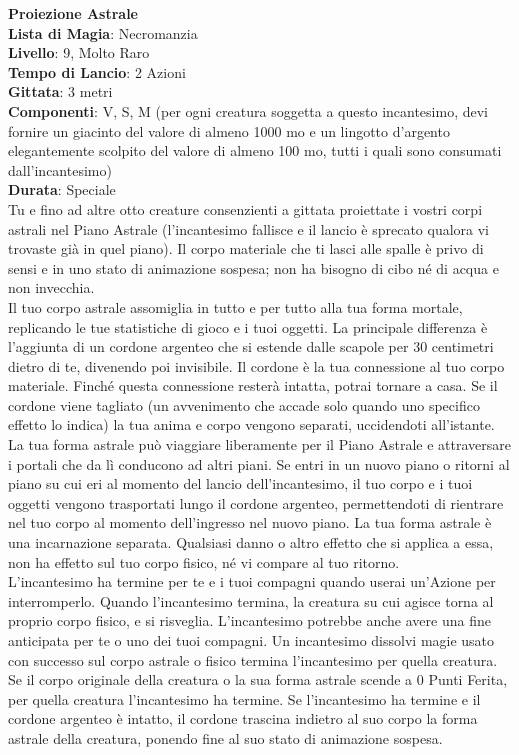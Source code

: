 \documentclass[a4paper,twoside,openany]{book}
\begin{document}
\begin{multicols}{2}
\medskip\textbf{Proiezione Astrale}\\
\textbf{Lista di Magia}: Necromanzia\\
\textbf{Livello}: 9, Molto Raro\\
\textbf{Tempo di Lancio}: 2 Azioni\\
\textbf{Gittata}: 3 metri\\
\textbf{Componenti}: V, S, M (per ogni creatura soggetta a questo incantesimo, devi fornire un giacinto del valore di almeno 1000 mo e un lingotto d'argento elegantemente scolpito del valore di almeno 100 mo, tutti i quali sono consumati dall'incantesimo)\\
\textbf{Durata}: Speciale\\
Tu e fino ad altre otto creature consenzienti a gittata proiettate i vostri corpi astrali nel Piano Astrale (l'incantesimo fallisce e il lancio è sprecato qualora vi trovaste già in quel piano). Il corpo materiale che ti lasci alle spalle è privo di sensi e in uno stato di animazione sospesa; non ha bisogno di cibo né di acqua e non invecchia.\\
Il tuo corpo astrale assomiglia in tutto e per tutto alla tua forma mortale, replicando le tue statistiche di gioco e i tuoi oggetti. La principale differenza è l'aggiunta di un cordone argenteo che si estende dalle scapole per 30 centimetri dietro di te, divenendo poi invisibile. Il cordone è la tua connessione al tuo corpo materiale. Finché questa connessione resterà intatta, potrai tornare a casa. Se il cordone viene tagliato (un avvenimento che accade solo quando uno specifico effetto lo indica) la tua anima e corpo vengono separati, uccidendoti all'istante.\\
La tua forma astrale può viaggiare liberamente per il Piano Astrale e attraversare i portali che da lì conducono ad altri piani. Se entri in un nuovo piano o ritorni al piano su cui eri al momento del lancio dell'incantesimo, il tuo corpo e i tuoi oggetti vengono trasportati lungo il cordone argenteo, permettendoti di rientrare nel tuo corpo al momento dell'ingresso nel nuovo piano. La tua forma astrale è una incarnazione separata. Qualsiasi danno o altro effetto che si applica a essa, non ha effetto sul tuo corpo fisico, né vi compare al tuo ritorno.\\
L'incantesimo ha termine per te e i tuoi compagni quando userai un'Azione per interromperlo. Quando l'incantesimo termina, la creatura su cui agisce torna al proprio corpo fisico, e si risveglia. L'incantesimo potrebbe anche avere una fine anticipata per te o uno dei tuoi compagni. Un incantesimo dissolvi magie usato con successo sul corpo astrale o fisico termina l'incantesimo per quella creatura. Se il corpo originale della creatura o la sua forma astrale scende a 0 Punti Ferita, per quella creatura l'incantesimo ha termine. Se l'incantesimo ha termine e il cordone argenteo è intatto, il cordone trascina indietro al suo corpo la forma astrale della creatura, ponendo fine al suo stato di animazione sospesa.\\

\end{multicols}
\end{document}
